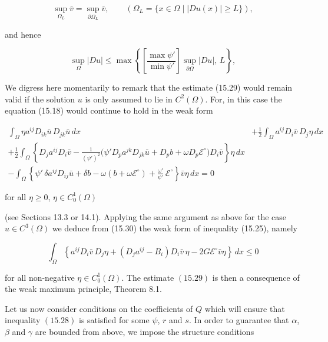 \[
\sup_{\Omega_L}\bar v=\sup_{\partial\Omega_L}\bar v,\qquad
(\Omega_L=\{x\in \Omega\mid |Du(x)|\ge L\}),
\]

and hence

\begin{equation}\tag{15.29}
\sup_{\Omega}|Du|\le \max\left\{\left[\frac{\max \psi'}{\min \psi'}\right]\sup_{\partial\Omega}|Du|,\,L\right\},
\end{equation}

We digress here momentarily to remark that the estimate (15.29) would remain valid if the solution \(u\) is only assumed to lie in \(C^2(\Omega)\). For, in this case the equation (15.18) would continue to hold in the weak form

\begin{equation}\tag{15.30}
\begin{aligned}
\int_{\Omega}\eta a^{ij}D_{ik}\bar u\,D_{jk}\bar u\,dx
&+\frac{1}{2}\int_{\Omega} a^{ij}D_i\bar v\,D_j\eta\,dx\\
+\frac{1}{2}\int_{\Omega}\left\{D_j a^{ij}D_i\bar v-\frac{1}{(\psi')^2}\bigl(\psi' D_p a^{jk}D_{jk}\bar u + D_p b + \omega D_p \mathcal{E}^{\circ}\bigr)D_i\bar v\right\}\eta\,dx\\
-\int_{\Omega}\left\{\psi'\,\delta a^{ij}D_{ij}\bar u+\delta b-\omega(b+\omega\mathcal{E}^{\circ})+\frac{\omega'}{\psi'}\,\mathcal{E}^{\circ}\right\}\bar v\eta\,dx=0
\end{aligned}
\end{equation}

for all \(\eta\ge 0\), \(\eta\in C_0^1(\Omega)\)

(see Sections 13.3 or 14.1). Applying the same argument as above for the case \(u\in C^3(\Omega)\) we deduce from (15.30) the weak form of inequality (15.25), namely

\begin{equation}\tag{15.31}
\int_{\Omega}\left\{a^{ij}D_i\bar v\,D_j\eta+(D_j a^{ij}-B_i)D_i\bar v\,\eta-2G\mathcal{E}^{\circ}\bar v\eta\right\}\,dx\le 0
\end{equation}

\pagestyle{empty}


for all non-negative $\eta \in C^{1}_{0}(\Omega)$. The estimate $(15.29)$ is then a consequence of the weak maximum principle, Theorem 8.1.

Let us now consider conditions on the coefficients of $Q$ which will ensure that inequality $(15.28)$ is satisfied for some $\psi$, $r$ and $s$. In order to guarantee that $\alpha$, $\beta$ and $\gamma$ are bounded from above, we impose the structure conditions

